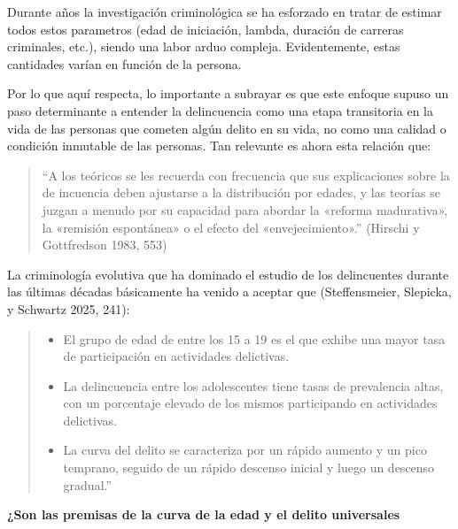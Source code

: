 \documentclass[
  spanish,
  letterpaper,
  DIV=11,
  numbers=noendperiod]{scrreprt}
\begin{document}
Durante años la investigación criminológica se ha esforzado en tratar de
estimar todos estos parametros (edad de iniciación, lambda, duración de
carreras criminales, etc.), siendo una labor arduo compleja.
Evidentemente, estas cantidades varían en función de la persona.

Por lo que aquí respecta, lo importante a subrayar es que este enfoque
supuso un paso determinante a entender la delincuencia como una etapa
transitoria en la vida de las personas que cometen algún delito en su
vida, no como una calidad o condición inmutable de las personas. Tan
relevante es ahora esta relación que:

\begin{quote}
``A los teóricos se les recuerda con frecuencia que sus explicaciones
sobre la de incuencia deben ajustarse a la distribución por edades, y
las teorías se juzgan a menudo por su capacidad para abordar la «reforma
madurativa», la «remisión espontánea» o el efecto del
«envejecimiento».'' (Hirschi y Gottfredson 1983, 553)
\end{quote}

La criminología evolutiva que ha dominado el estudio de los delincuentes
durante las últimas décadas básicamente ha venido a aceptar que
(Steffensmeier, Slepicka, y Schwartz 2025, 241):

\begin{quote}
\begin{itemize}
\item
  El grupo de edad de entre los 15 a 19 es el que exhibe una mayor tasa
  de participación en actividades delictivas.
\item
  La delincuencia entre los adolescentes tiene tasas de prevalencia
  altas, con un porcentaje elevado de los mismos participando en
  actividades delictivas.
\item
  La curva del delito se caracteriza por un rápido aumento y un pico
  temprano, seguido de un rápido descenso inicial y luego un descenso
  gradual.''
\end{itemize}
\end{quote}

\begin{tcolorbox}[enhanced jigsaw, bottomtitle=1mm, toprule=.15mm, colbacktitle=quarto-callout-note-color!10!white, bottomrule=.15mm, leftrule=.75mm, colframe=quarto-callout-note-color-frame, opacitybacktitle=0.6, titlerule=0mm, breakable, colback=white, left=2mm, arc=.35mm, title=\textcolor{quarto-callout-note-color}{\faInfo}\hspace{0.5em}{Nota}, toptitle=1mm, coltitle=black, rightrule=.15mm, opacityback=0]

\textbf{¿Son las premisas de la curva de la edad y el delito
universales}

\end{tcolorbox}
\end{document}
